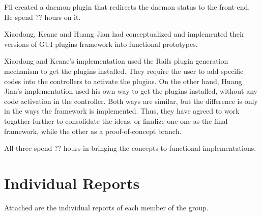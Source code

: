 \documentclass{article}
\begin{document}
Fil created a daemon plugin that redirects the daemon status to the front-end. He spend ?? hours on it.

Xiaodong, Keane and Huang Jian had conceptualized and implemented their versions of GUI plugins framework into functional prototypes.

Xiaodong and Keane's implementation used the Rails plugin generation mechanism to get the plugins installed. They require the user to add specific codes into the controllers to activate the plugins. On the other hand, Huang Jian's implementation used his own way to get the plugins installed, without any code activation in the controller. Both ways are similar, but the difference is only in the ways the framework is implemented. Thus, they have agreed to work togather further to consolidate the ideas, or finalize one one as the final framework, while the other as a proof-of-concept branch. 

All three spend ?? hours in bringing the concepts to functional implementations. 
 
\section*{Individual Reports}

Attached are the individual reports of each member of the group. 



%

%

%

%

%

%
\end{document}
